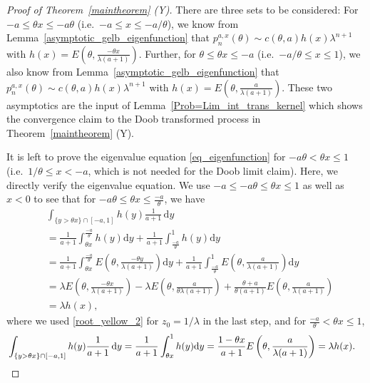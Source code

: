 \documentclass[12pt]{article}
\newcommand{\1}{\mathds{1}}
\renewcommand{\d}{\mathrm{d}}
\theoremstyle{definition}
\theoremstyle{plain}
\theoremstyle{remark}
\begin{document}
\begin{proof}[Proof of Theorem~\ref{maintheorem} (Y)]
There are three sets to be considered: For $-a\leq \theta x\leq -a \theta$ (i.e.\ $-a\leq x\leq -a/\theta$), we know from Lemma~\ref{asymptotic_gelb_eigenfunction} that $p_n^{a,x}(\theta)\sim c(\theta,a)h(x)\lambda^{n+1}$ with \linebreak $h(x)= E\left(\theta,\frac{-\theta x}{\lambda(a+1)}\right)$.
Further, for $\theta\leq \theta x \leq -a$ (i.e.\ $-a/\theta\leq x\leq 1$), we also know from Lemma~\ref{asymptotic_gelb_eigenfunction} that $p_n^{a,x}(\theta)\sim c(\theta,a)h(x)\lambda^{n+1}$ with $h(x)= E\left(\theta,\frac{a}{\lambda(a+1)}\right)$.
These two asymptotics are the input of Lemma~\ref{Prob=Lim_int_trans_kernel} which shows the convergence claim to the Doob transformed process in Theorem~\ref{maintheorem} (Y). 

It is left to prove the eigenvalue equation \eqref{eq_eigenfunction} for $-a\theta<\theta x\leq 1$ (i.e.\ $1/\theta\leq x < -a$, which is not needed for the Doob limit claim). Here, we directly verify the eigenvalue equation. We use $-a\leq -a\theta\leq\theta x\leq 1$ as well as $x<0$ to see that for $-a\theta\leq\theta x\leq\frac{-a}{\theta}$, we have
      \begin{align*}
        &\int_{\{y>\theta x\}\cap[-a,1]} h(y) \frac{1}{a+1}\,\d y
        \\&=\frac{1}{a+1}\int_{\theta x}^{\frac{-a}{\theta}}h(y)\d y+\frac{1}{a+1}\int_{\frac{-a}{\theta}}^1h(y)\d y
        \\&=\frac{1}{a+1}\int_{\theta x}^{\frac{-a}{\theta}}E\left(\theta,\frac{-\theta y}{\lambda(a+1)}\right)\d y+\frac{1}{a+1}\int_{\frac{-a}{\theta}}^1E\left(\theta,\frac{a}{\lambda(a+1)}\right)\d y
        \\&=\lambda E\left(\theta,\frac{-\theta x}{\lambda(a+1)}\right)-\lambda E\left(\theta,\frac{a}{\theta\lambda(a+1)}\right)+\frac{\theta+a}{\theta(a+1)}E\left(\theta,\frac{a}{\lambda(a+1)}\right)
        \\&=\lambda h(x),
      \end{align*}
      where we used \eqref{root_yellow_2} for $z_0=1/\lambda$ in the last step, and for $\frac{-a}{\theta}<\theta x\leq 1$,
      \begin{align*}
          &\int_{\{y>\theta x\}\cap[-a,1]} h(y) \frac{1}{a+1}\,\d y
        =\frac{1}{a+1}\int_{\theta x}^{1}h(y)\d y=\frac{1-\theta x}{a+1} E\left(\theta,\frac{a}{\lambda(a+1)}\right)=\lambda h(x). \qedhere
      \end{align*}
\end{proof} 
\end{document}
